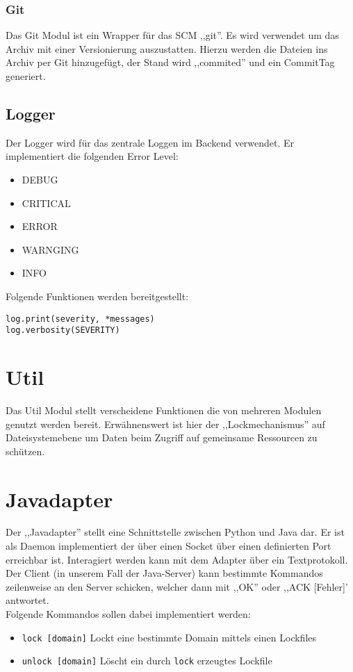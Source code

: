 \subsubsection{Git}
\label{ssub:git}
Das Git Modul ist ein Wrapper für das SCM ,,git''. Es wird verwendet um das Archiv mit einer Versionierung auszustatten. Hierzu werden 
die Dateien ins Archiv per Git hinzugefügt, der Stand wird ,,commited'' und ein CommitTag generiert.



\subsection{Logger}
\label{sub:logger}
Der Logger wird für das zentrale Loggen im Backend verwendet. Er implementiert die folgenden Error Level:
\begin{itemize}
    \item DEBUG
    \item CRITICAL
    \item ERROR
    \item WARNGING
    \item INFO
\end{itemize}

Folgende Funktionen werden bereitgestellt:
\begin{verbatim}
log.print(severity, *messages)
log.verbosity(SEVERITY)
\end{verbatim}


\section{Util} 
\label{sec:util}
Das Util Modul stellt verscheidene Funktionen die von mehreren Modulen genutzt werden bereit. Erwähnenswert ist hier der ,,Lockmechanismus''
auf Dateisystemebene um Daten beim Zugriff auf gemeinsame  Ressourcen zu schützen.



\section{Javadapter} 
\label{sec:javadapter}
Der ,,Javadapter'' stellt eine Schnittstelle zwischen Python und Java dar. Er ist als Daemon implementiert der über einen Socket über einen definierten Port
erreichbar ist. Interagiert werden kann mit dem Adapter über ein Textprotokoll. Der Client (in unserem Fall der Java-Server) kann bestimmte Kommandos
zeilenweise an den Server schicken, welcher dann mit ,,OK'' oder ,,ACK [Fehler]' antwortet.
\\
Folgende Kommandos sollen dabei implementiert werden:
\begin{itemize}
    \item \texttt{lock [domain]}
        Lockt eine bestimmte Domain mittels einen Lockfiles
    \item \texttt{unlock [domain]}
        Löscht ein durch \texttt{lock} erzeugtes Lockfile
\end{itemize}

